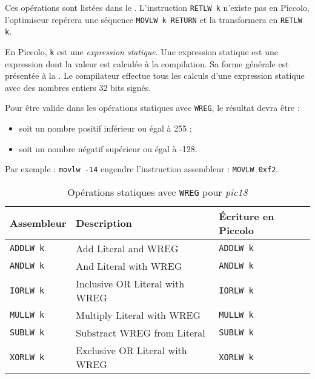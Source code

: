 
Ces opérations sont listées dans le . L’instruction \texttt{RETLW k} n’existe pas en Piccolo, l’optimiseur repérera une séquence \texttt{MOVLW k RETURN} et la transformera en \texttt{RETLW k}.

En Piccolo, \texttt{k} est une \emph{expression statique}. Une expression statique est une expression dont la valeur est calculée à la compilation. Sa forme générale est présentée à la . Le compilateur effectue tous les calculs d'une expression statique avec des nombres entiers 32 bits signés.

Pour être valide dans les opérations statiques avec \texttt{WREG}, le résultat devra être :
\begin{itemize}
  \item soit un nombre positif inférieur ou égal à 255 ;
  \item soit un nombre négatif supérieur ou égal à -128.
\end{itemize}

Par exemple : \texttt{movlw -14} engendre l’instruction assembleur : \texttt{MOVLW 0xf2}.


\begin{table}[!ht]
  \centering
  \small
  \begin{tabular}{lll}
    \textbf{Assembleur} & \textbf{Description} & \textbf{Écriture en Piccolo}\\
    \hline
    \texttt{ADDLW k} & Add Literal and WREG & \texttt{ADDLW k}\\
    \texttt{ANDLW k} & And Literal with WREG & \texttt{ANDLW k}\\
    \texttt{IORLW k} & Inclusive OR Literal with WREG & \texttt{IORLW k}\\
    \texttt{MULLW k} & Multiply Literal with WREG & \texttt{MULLW k}\\
    \texttt{SUBLW k} & Substract WREG from Literal & \texttt{SUBLW k}\\
    \texttt{XORLW k} & Exclusive OR Literal with WREG & \texttt{XORLW k}\\
    \hline
  \end{tabular}
  \caption{Opérations statiques avec \texttt{WREG} pour \emph{pic18}}
\end{table}




